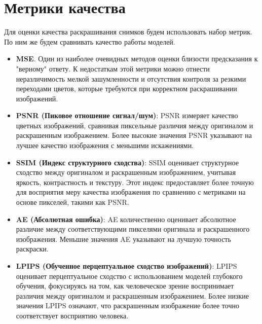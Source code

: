 \documentclass[14pt]{article}
\begin{document}
\section{Метрики качества}
Для оценки качества раскрашивания снимков будем использовать набор метрик. По ним же будем сравнивать качество работы моделей.

\begin{itemize}
    \item \textbf{MSE}. Один из наиболее очевидных методов оценки близости предсказания к "верному" ответу.
    К недостаткам этой метрики можно отнести неразличимость мелкой зашумленности и отсутствия контроля за резкими переходами цветов,
    которые требуются при корректном раскрашивании изображений.

    \item \textbf{PSNR (Пиковое отношение сигнал/шум)}: PSNR измеряет качество цветных изображений, сравнивая пиксельные различия между оригиналом и 
    раскрашенным изображением. Более высокие значения PSNR указывают на лучшее качество изображения с меньшими искажениями.

    \item \textbf{SSIM (Индекс структурного сходства)}: SSIM оценивает структурное сходство между оригиналом и раскрашенным изображением, 
    учитывая яркость, контрастность и текстуру. Этот индекс предоставляет более точную для восприятия меру качества изображения по сравнению 
    с метриками на основе пикселей, такими как PSNR.

    \item \textbf{AE (Абсолютная ошибка)}: AE количественно оценивает абсолютное различие между соответствующими пикселями оригинала и 
    раскрашенного изображения. Меньшие значения AE указывают на лучшую точность раскраски.

    \item \textbf{LPIPS (Обученное перцептуальное сходство изображений)}: LPIPS оценивает перцептуальное сходство с использованием моделей 
    глубокого обучения, фокусируясь на том, как человеческое зрение воспринимает различия между оригиналом и раскрашенным изображением. 
    Более низкие значения LPIPS означают, что раскрашенным изображение более точно соответствует восприятию человека.
\end{itemize}

\printbibliography
\end{document}
